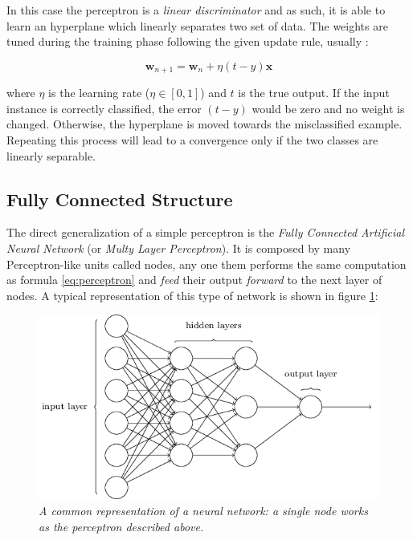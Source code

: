 \documentclass[12pt,a4paper]{report}
\begin{document}
In this case the perceptron is a \textit{linear discriminator} and as such, it is able to learn an hyperplane which linearly separates two set of data.
The weights are tuned during the training phase following the given update rule, usually :

\begin{equation}
 \bm{w}_{n+1} = \bm{w}_n + \eta (t - y)\bm{x}
 \label{eq:perceptron}
\end{equation}

where $\eta$ is the learning rate ($\eta \in [0,1]$) and $t$ is the true output. If the input instance is correctly classified,  the error $(t - y)$ would be zero and no weight is changed. 
Otherwise, the hyperplane is moved towards the misclassified example. 
Repeating this process will lead to a convergence only if the two classes are linearly separable.  

\subsection*{Fully Connected Structure}

The direct generalization of a simple perceptron is the \textit{Fully Connected Artificial Neural Network} (or {\it Multy Layer Perceptron}). 
It is composed by many Perceptron-like units called nodes, any one them performs the same computation as formula \ref{eq:perceptron} and \textit{feed} their output \textit{forward} to the next layer of nodes. 
A typical representation of this type of network is shown in figure \ref{fig:ann}:

\begin{figure}[h]
 \centering
 \includegraphics[scale=0.5]{./images/neural_net.png}
 \caption{{\it A common representation of a neural network: a single node works as the perceptron described above.}}
 \label{fig:ann}
\end{figure}
\end{document}
